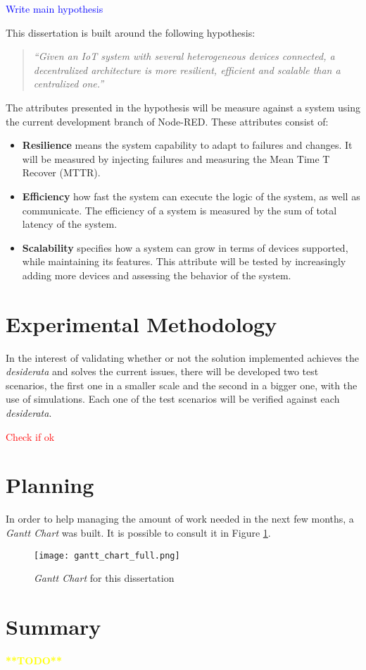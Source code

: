 \textcolor{blue}{Write main hypothesis}

This dissertation is built around the following hypothesis:

\begin{quote}
    \emph{``Given an IoT system with several heterogeneous devices connected, a decentralized architecture is more resilient, efficient and scalable than a centralized one.''}
\end{quote}

The attributes presented in the hypothesis will be measure against a system using the current development branch of Node-RED. These attributes consist of:

\begin{itemize}
    \item \textbf{Resilience} means the system capability to adapt to failures and changes. It will be measured by injecting failures and measuring the Mean Time T Recover (MTTR).
    \item \textbf{Efficiency} how fast the system can execute the logic of the system, as well as communicate. The efficiency of a system is measured by the sum of total latency of the system. 
    \item \textbf{Scalability} specifies how a system can grow in terms of devices supported, while maintaining its features. This attribute will be tested by increasingly adding more devices and assessing the behavior of the system.
\end{itemize}

\section{Experimental Methodology}\label{sec:exp_meth}

In the interest of validating whether or not the solution implemented achieves the \emph{desiderata} and solves the current issues, there will be developed two test scenarios, the first one in a smaller scale and the second in a bigger one, with the use of simulations. Each one of the test scenarios will be verified against each \emph{desiderata}. 

\textcolor{red}{Check if ok}

\section{Planning}\label{sec:planning}

In order to help managing the amount of work needed in the next few months, a \textit{Gantt Chart} was built. It is possible to consult it in Figure \ref{fig:gantt}. 
\begin{figure}[h]
    \caption{\textit{Gantt Chart} for this dissertation}
    \label{fig:gantt}
    \centering
    \texttt{[image: gantt\_chart\_full.png]}
    \end{figure}

\section{Summary}\label{sec:stat_summary}

\textcolor{yellow}{\textbf{**TODO**}}
